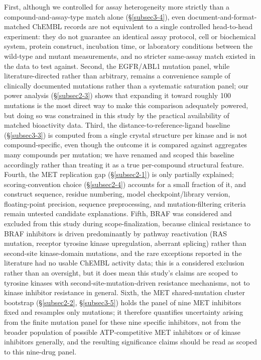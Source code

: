 \documentclass[pdflatex,sn-mathphys-num]{sn-jnl}%
\theoremstyle{thmstyleone}%
\theoremstyle{thmstyletwo}%
\theoremstyle{thmstylethree}%
\begin{document}
First, although we controlled for assay heterogeneity more strictly than a compound-and-assay-type match alone (\S\ref{subsec3-4}), even document-and-format-matched ChEMBL records are not equivalent to a single controlled head-to-head experiment: they do not guarantee an identical assay protocol, cell or biochemical system, protein construct, incubation time, or laboratory conditions between the wild-type and mutant measurements, and no stricter same-assay match existed in the data to test against. Second, the EGFR/ABL1 mutation panel, while literature-directed rather than arbitrary, remains a convenience sample of clinically documented mutations rather than a systematic saturation panel; our power analysis (\S\ref{subsec2-3}) shows that expanding it toward roughly 100 mutations is the most direct way to make this comparison adequately powered, but doing so was constrained in this study by the practical availability of matched bioactivity data. Third, the distance-to-reference-ligand baseline (\S\ref{subsec3-3}) is computed from a single crystal structure per kinase and is not compound-specific, even though the outcome it is compared against aggregates many compounds per mutation; we have renamed and scoped this baseline accordingly rather than treating it as a true per-compound structural feature. Fourth, the MET replication gap (\S\ref{subsec2-1}) is only partially explained; scoring-convention choice (\S\ref{subsec2-4}) accounts for a small fraction of it, and construct sequence, residue numbering, model checkpoint/library version, floating-point precision, sequence preprocessing, and mutation-filtering criteria remain untested candidate explanations. Fifth, BRAF was considered and excluded from this study during scope-finalization, because clinical resistance to BRAF inhibitors is driven predominantly by pathway reactivation (RAS mutation, receptor tyrosine kinase upregulation, aberrant splicing) rather than second-site kinase-domain mutations, and the rare exceptions reported in the literature had no usable ChEMBL activity data; this is a considered exclusion rather than an oversight, but it does mean this study's claims are scoped to tyrosine kinases with second-site-mutation-driven resistance mechanisms, not to kinase inhibitor resistance in general. Sixth, the MET shared-mutation cluster bootstrap (\S\ref{subsec2-2}, \S\ref{subsec3-5}) holds the panel of nine MET inhibitors fixed and resamples only mutations; it therefore quantifies uncertainty arising from the finite mutation panel for these nine specific inhibitors, not from the broader population of possible ATP-competitive MET inhibitors or of kinase inhibitors generally, and the resulting significance claims should be read as scoped to this nine-drug panel.
\end{document}
